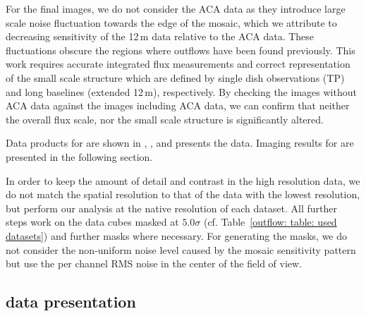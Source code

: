 For the final images, we do not consider the ACA data as they introduce large scale noise fluctuation towards the edge of the mosaic, which we attribute to decreasing sensitivity of the 12\,m data relative to the ACA data. These fluctuations obscure the regions where outflows have been found previously. This work requires accurate integrated flux measurements and correct representation of the small scale structure which are defined by single dish observations (TP) and long baselines (extended 12\,m), respectively. By checking the images without ACA data against the images including ACA data, we can confirm that neither the overall flux scale, nor the small scale structure is significantly altered.

Data products for  are shown in \citet{2013Natur.499..450B}, \citet{2015ApJ...801...63M}, \citet{Leroy:2015ds} and \citet{2018ApJ...867..111Z} presents the  data. Imaging results for  are presented in the following section.

In order to keep the amount of detail and contrast in the high resolution data, we do not match the spatial resolution to that of the data with the lowest resolution, but perform our analysis at the native resolution of each dataset. All further steps work on the data cubes masked at $5.0 \sigma$ (cf. Table~\ref{outflow: table: used datasets}) and further masks where necessary. For generating the masks, we do not consider the non-uniform noise level caused by the mosaic sensitivity pattern but use the per channel RMS noise in the center of the field of view.



\subsection{ data presentation}
\label{outflow: section: channel maps}

